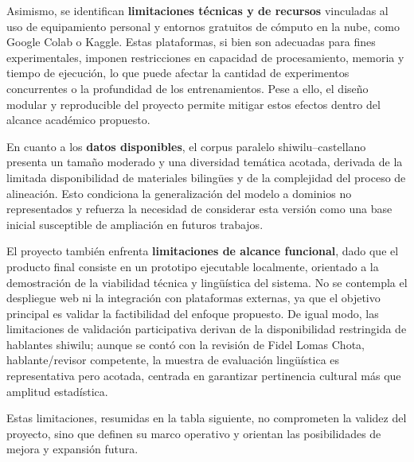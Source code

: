 \documentclass[12pt,a4paper,oneside]{book}
\begin{document}
Asimismo, se identifican \textbf{limitaciones técnicas y de recursos} vinculadas al uso de equipamiento personal y entornos gratuitos de cómputo en la nube, como Google Colab o Kaggle. Estas plataformas, si bien son adecuadas para fines experimentales, imponen restricciones en capacidad de procesamiento, memoria y tiempo de ejecución, lo que puede afectar la cantidad de experimentos concurrentes o la profundidad de los entrenamientos. Pese a ello, el diseño modular y reproducible del proyecto permite mitigar estos efectos dentro del alcance académico propuesto.

En cuanto a los \textbf{datos disponibles}, el corpus paralelo shiwilu--castellano presenta un tamaño moderado y una diversidad temática acotada, derivada de la limitada disponibilidad de materiales bilingües y de la complejidad del proceso de alineación. Esto condiciona la generalización del modelo a dominios no representados y refuerza la necesidad de considerar esta versión como una base inicial susceptible de ampliación en futuros trabajos.

El proyecto también enfrenta \textbf{limitaciones de alcance funcional}, dado que el producto final consiste en un prototipo ejecutable localmente, orientado a la demostración de la viabilidad técnica y lingüística del sistema. No se contempla el despliegue web ni la integración con plataformas externas, ya que el objetivo principal es validar la factibilidad del enfoque propuesto. De igual modo, las limitaciones de validación participativa derivan de la disponibilidad restringida de hablantes shiwilu; aunque se contó con la revisión de Fidel Lomas Chota, hablante/revisor competente, la muestra de evaluación lingüística es representativa pero acotada, centrada en garantizar pertinencia cultural más que amplitud estadística.

Estas limitaciones, resumidas en la tabla siguiente, no comprometen la validez del proyecto, sino que definen su marco operativo y orientan las posibilidades de mejora y expansión futura.
\end{document}
